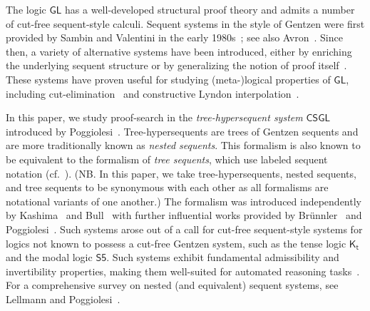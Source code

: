 \documentclass[copyright,creativecommons]{eptcs}
\newcommand{\treegl}{\mathsf{CSGL}}
\newcommand{\logicgl}{\mathsf{GL}}
\begin{document}

The logic $\logicgl$ has a well-developed structural proof theory and admits a number of cut-free sequent-style calculi. Sequent systems in the style of Gentzen were first provided by Sambin and Valentini in the early 1980s~\cite{SamVal80,SamVal82}; see also Avron~\cite{Avr84}. Since then, a variety of alternative systems have been introduced, either by enriching the underlying sequent structure or by generalizing the notion of proof itself~\cite{Lyo25,ManKas24,Pog09b,Sha14,Sim94}. These systems have proven useful for studying (meta-)logical properties of $\logicgl$, including cut-elimination~\cite{ManKas24} and constructive Lyndon interpolation~\cite{Sha14}. %


In this paper, we study proof-search in the \emph{tree-hypersequent system} $\treegl$ introduced by Poggiolesi~\cite{Pog09b}. Tree-hypersequents are trees of Gentzen sequents and are more traditionally known as \emph{nested sequents}. This formalism is also known to be equivalent to the formalism of \emph{tree sequents}, which use labeled sequent notation (cf.~\cite{GorRam12,IshKik07,LyoOst24}). (NB. In this paper, we take tree-hypersequents, nested sequents, and tree sequents to be synonymous with each other as all formalisms are notational variants of one another.) The formalism was introduced independently by Kashima~\cite{Kas94} and Bull~\cite{Bul92} with further influential works provided by Br{\"u}nnler~\cite{Bru09} and Poggiolesi~\cite{Pog09,Pog09b}. Such systems arose out of a call for cut-free sequent-style systems for logics not known to possess a cut-free Gentzen system, such as the tense logic $\mathsf{K_{t}}$ and the modal logic $\mathsf{S5}$. Such systems exhibit fundamental admissibility and invertibility properties, making them well-suited for automated reasoning tasks~\cite{LyoTiuGorClo20,LyoGom22}. For a comprehensive survey on nested (and equivalent) sequent systems, see Lellmann and Poggiolesi~\cite{LelPog24}.
\end{document}
